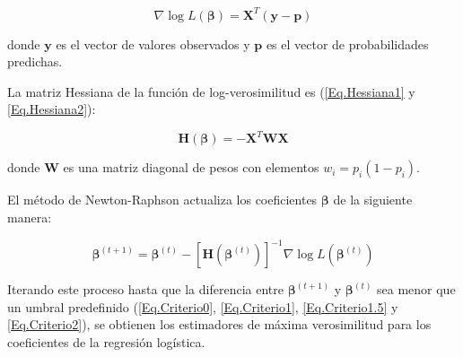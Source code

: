 \begin{equation}
\nabla \log L(\boldsymbol{\beta}) = \mathbf{X}^T (\mathbf{y} - \mathbf{p})
\end{equation}

donde $\mathbf{y}$ es el vector de valores observados y $\mathbf{p}$ es el vector de probabilidades predichas.

La matriz Hessiana de la función de log-verosimilitud es (\ref{Eq.Hessiana1} y \ref{Eq.Hessiana2}):

\begin{equation}
\mathbf{H}(\boldsymbol{\beta}) = -\mathbf{X}^T \mathbf{W} \mathbf{X}
\end{equation}

donde $\mathbf{W}$ es una matriz diagonal de pesos con elementos $w_i = p_i (1 - p_i)$.

El método de Newton-Raphson actualiza los coeficientes $\boldsymbol{\beta}$ de la siguiente manera:

\begin{equation}\label{Eq.Criterio3}
\boldsymbol{\beta}^{(t+1)} = \boldsymbol{\beta}^{(t)} - [\mathbf{H}(\boldsymbol{\beta}^{(t)})]^{-1} \nabla \log L(\boldsymbol{\beta}^{(t)})
\end{equation}

Iterando este proceso hasta que la diferencia entre $\boldsymbol{\beta}^{(t+1)}$ y $\boldsymbol{\beta}^{(t)}$ sea menor que un umbral predefinido (\ref{Eq.Criterio0}, \ref{Eq.Criterio1}, \ref{Eq.Criterio1.5} y \ref{Eq.Criterio2}), se obtienen los estimadores de máxima verosimilitud para los coeficientes de la regresión logística.

